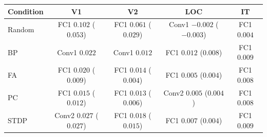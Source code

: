 \begin{tabular}{lcccc}
\toprule
Condition & V1 & V2 & LOC & IT \\
\midrule
Random & FC1 $0.102$ ($0.053$) & FC1 $0.061$ ($0.029$) & Conv1 $-0.002$ ($-0.003$) & FC1 $0.004$ \\
BP & Conv1 $0.022$ & Conv1 $0.012$ & FC1 $0.012$ ($0.008$) & FC1 $0.009$ \\
FA & FC1 $0.020$ ($0.009$) & FC1 $0.014$ ($0.004$) & FC1 $0.005$ ($0.004$) & FC1 $0.008$ \\
PC & FC1 $0.015$ ($0.012$) & FC1 $0.013$ ($0.006$) & Conv2 $0.005$ ($0.004$) & FC1 $0.008$ \\
STDP & Conv2 $0.027$ ($0.027$) & FC1 $0.018$ ($0.015$) & FC1 $0.007$ ($0.004$) & FC1 $0.009$ \\
\bottomrule
\end{tabular}
